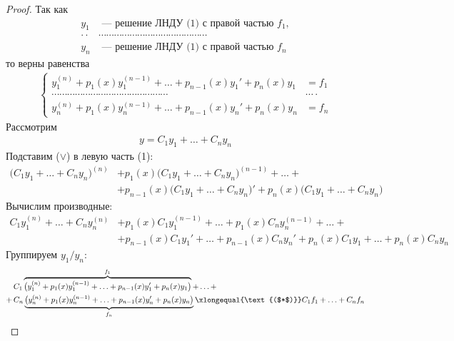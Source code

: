 \begin{proof}
    Так как \vspace{-\topsep}
    \begin{align*}
        y_1 &\text{ --- решение ЛНДУ (1) с правой частью } f_1, \\ 
        \cdot\cdot&\cdots\cdots\cdots\cdots\cdots\cdots\cdots\cdots\cdots\cdots\cdots\cdots\cdots\cdots \\
        y_n &\text{ --- решение ЛНДУ (1) с правой частью } f_n
    \end{align*}
    то верны равенства
    \begin{align*}
        \left\{\begin{aligned}
            y_1^{(n)} + p_1(x)y_1^{(n-1)} + \ldots + p_{n-1}(x)y_1' + p_n(x)y_1 &= f_1 \\ 
            \cdots\cdots\cdots\cdots\cdots\cdots\cdots\cdots\cdots\cdots\cdots\cdots\cdots\cdots\cdots&\cdots\cdot \\
            y_n^{(n)} + p_1(x)y_n^{(n-1)} + \ldots + p_{n-1}(x)y_n' + p_n(x)y_n &= f_n
        \end{aligned}\right. \tag{$*$}
    \end{align*}
    Рассмотрим \vspace{-\topsep}
    \begin{align*}
        y = C_1 y_1 + \ldots + C_ny_n \tag{$\vee$}
    \end{align*}
    Подставим ($\vee$) в левую часть (1):
    \begin{align*}
        \big(C_1 y_1 + \ldots + C_ny_n\big)^{(n)} &+ p_1(x)\big(C_1 y_1 + \ldots + C_ny_n\big)^{(n-1)} + \ldots + \\ 
        &+ p_{n-1} (x) \big(C_1 y_1 + \ldots + C_ny_n\big)' + p_n(x) \big(C_1 y_1 + \ldots + C_ny_n\big)
    \end{align*}
    Вычислим производные:
    \begin{align*}
        C_1 y_1^{(n)} + \ldots + C_ny_n^{(n)} &+ p_1(x)C_1 y_1^{(n-1)} + \ldots + p_1(x)C_ny_n^{(n-1)} + \ldots + \\ 
        &+ p_{n-1} (x) C_1 y_1' + \ldots + p_{n-1}(x)C_ny_n' + p_n(x) C_1 y_1 + \ldots + p_n(x)C_ny_n
    \end{align*}
    Группируем $y_1/y_n$:
    \begin{align*}
        &C_1 \overbrace{\big(y_1^{(n)} + p_1(x)y_1^{(n-1)} + \ldots + p_{n-1} (x) y_1' + p_n(x) y_1\big)}^{f_1} + \ldots + \\ 
        +\, &C_n \underbrace{\big(y_n^{(n)} + p_1(x)y_n^{(n-1)} + \ldots + p_{n-1}(x) y_n'+ p_n(x) y_n\big)}_{f_n} \xlongequal{\text{($*$)}} C_1f_1 + \ldots + C_nf_n
    \end{align*}
\end{proof}
